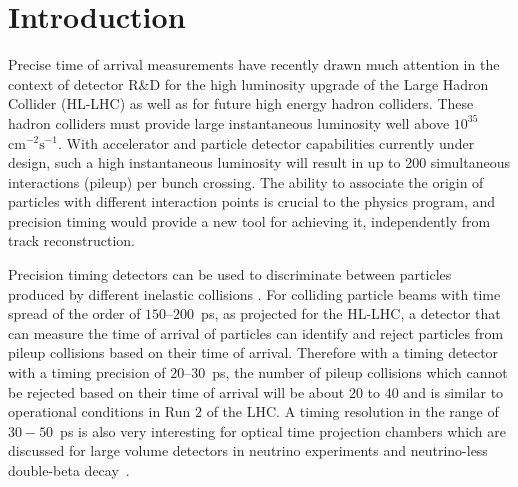 \section{Introduction}
\label{sec:introduction}


Precise time of arrival measurements have recently drawn much attention in the
context of detector R\&D for the high luminosity upgrade of the Large Hadron
Collider (HL-LHC) as well as for future high energy hadron colliders. These
hadron colliders must provide large instantaneous luminosity well above
$10^{35}$~$\mathrm{cm}^{-2}\mathrm{s}^{-1}$. With accelerator and particle
detector capabilities currently under design, such a high instantaneous
luminosity will result in up to 200 simultaneous interactions (pileup) per bunch
crossing. The ability to associate the origin of particles with different
interaction points is crucial to the physics program, and precision timing would
provide a new tool for achieving it, independently from track reconstruction.


Precision timing detectors can be used to discriminate
between particles produced by different inelastic collisions \cite{adielba}. For
colliding particle beams with time spread of the order of $150$--$200$~ps, as
projected for the HL-LHC, a detector that can measure the time of arrival of
particles can identify and reject particles from pileup collisions based on
their time of arrival. Therefore with a timing detector with a timing precision
of $20$--$30$~ps, the number of pileup collisions which cannot be rejected based
on their time of arrival will be about $20$ to $40$ and is similar to
operational conditions in Run 2 of the LHC. A timing resolution in the range of
$30-50$~ps is also very interesting for optical time projection chambers which
are discussed for large volume detectors in neutrino experiments and
neutrino-less double-beta decay~\cite{Aberle:2013jba, otpc}. 


